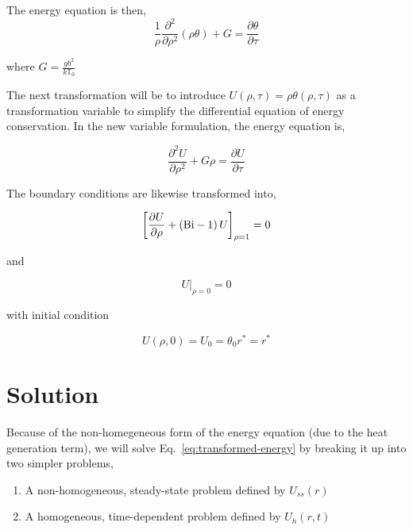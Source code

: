 The energy equation is then,
\begin{equation}
    \frac{1}{\rho}\frac{\partial^2}{\partial \rho^2}(\rho\theta) + G = \frac{\partial\theta}{\partial \tau}
\end{equation}

where $G = \frac{gb^2}{k\mathbb{T}_0}$

The next transformation will be to introduce $U(\rho,\tau) = \rho\theta(\rho,\tau)$ as a transformation variable to simplify the differential equation of energy conservation. In the new variable formulation, the energy equation is,

\begin{equation}\label{eq:transformed-energy}
    \frac{\partial^2 U}{\partial \rho^2} + G\rho = \frac{\partial U}{\partial \tau}
\end{equation}

The boundary conditions are likewise transformed into,

\begin{equation}\label{eq:transformed-bc-1}
    \left[\frac{\partial U}{\partial \rho} + \left(\mathrm{Bi}-1\right)U\right]_{\rho = 1}= 0
\end{equation}

and

\begin{equation}\label{eq:transformed-bc-2}
    U\big|_{\rho=0} = 0
\end{equation}

with initial condition

\begin{equation}\label{eq:transformed-ic}
    U(\rho,0) = U_0 = \theta_0 r^* = r^*
\end{equation}




\section{Solution}

Because of the non-homegeneous form of the energy equation (due to the heat generation term), we will solve Eq.~\ref{eq:transformed-energy} by breaking it up into two simpler problems, 

\begin{enumerate}
\item A non-homogeneous, steady-state problem defined by $U_{ss}(r)$
\item A homogeneous, time-dependent problem defined by $U_h(r,t)$
\end{enumerate}

